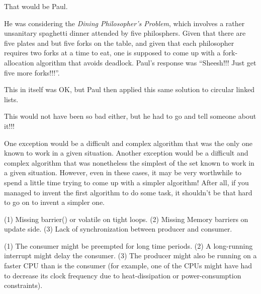 
	That would be Paul.

	He was considering the \emph{Dining Philosopher's Problem}, which
	involves a rather unsanitary spaghetti dinner attended by
	five philosphers.
	Given that there are five plates and but five forks on the table, and
	given that each philosopher requires two forks at a time to eat,
	one is supposed to come up with a fork-allocation algorithm that
	avoids deadlock.
	Paul's response was ``Sheesh!!!  Just get five more forks!!!''.

	This in itself was OK, but Paul then applied this same solution to
	circular linked lists.

	This would not have been so bad either, but he had to go and tell
	someone about it!!!


	One exception would be a difficult and complex algorithm that
	was the only one known to work in a given situation.
	Another exception would be a difficult and complex algorithm
	that was nonetheless the simplest of the set known to work in
	a given situation.
	However, even in these cases, it may be very worthwhile to spend
	a little time trying to come up with a simpler algorithm!
	After all, if you managed to invent the first algorithm
	to do some task, it shouldn't be that hard to go on to
	invent a simpler one.


(1)	Missing barrier() or volatile on tight loops.
(2)	Missing Memory barriers on update side.
(3)	Lack of synchronization between producer and consumer.


(1)	The consumer might be preempted for long time periods.
(2)	A long-running interrupt might delay the consumer.
(3)	The producer might also be running on a faster CPU than is the
	consumer (for example, one of the CPUs might have had to decrease its
	clock frequency due to heat-dissipation or power-consumption
	constraints).


